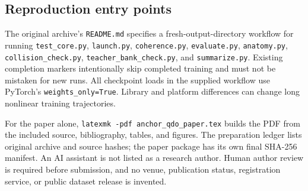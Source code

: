 \documentclass[11pt,letterpaper]{article}
\theoremstyle{remark}\newtheorem{remark}{Remark}
\begin{document}
\subsection{Reproduction entry points}
The original archive's \texttt{README.md} specifies a fresh-output-directory workflow for running \texttt{test\_core.py}, \texttt{launch.py}, \texttt{coherence.py}, \texttt{evaluate.py}, \texttt{anatomy.py}, \texttt{collision\_check.py}, \texttt{teacher\_bank\_check.py}, and \texttt{summarize.py}. Existing completion markers intentionally skip completed training and must not be mistaken for new runs. All checkpoint loads in the supplied workflow use PyTorch's \texttt{weights\_only=True}. Library and platform differences can change long nonlinear training trajectories.

For the paper alone, \texttt{latexmk -pdf anchor\_qdo\_paper.tex} builds the PDF from the included source, bibliography, tables, and figures. The preparation ledger lists original archive and source hashes; the paper package has its own final SHA-256 manifest. An AI assistant is not listed as a research author. Human author review is required before submission, and no venue, publication status, registration service, or public dataset release is invented.

\clearpage


\end{document}
